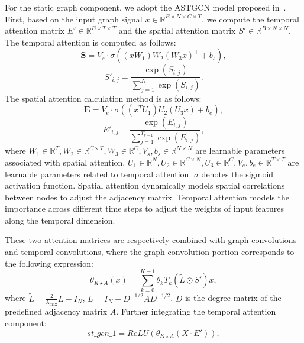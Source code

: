 \documentclass[preprint,12pt,authoryear]{elsarticle}
\begin{document}
For the static graph component, we adopt the ASTGCN model proposed in~\cite{guo2019attention}. First, based on the input graph signal $x\in \mathbb{R}^{B\times N \times C \times T}$, we compute the temporal attention matrix $E'\in \mathbb{R}^{B\times T\times T}$ and the spatial attention matrix $S'\in \mathbb{R}^{B\times N\times N}$. The temporal attention is computed as follows:
\begin{equation}
\mathbf{S} = V_s \cdot \sigma\left( (x W_1) W_2 (W_3 x)^\top + b_s \right),
\end{equation}
\begin{equation}
S'_{i,j} = \frac{\exp(S_{i,j})}{\sum_{j=1}^{N} \exp(S_{i,j})}.
\end{equation}
The spatial attention calculation method is as follows:
\begin{equation}
\mathbf{E} = V_e \cdot \sigma\left( (x^T U_1) U_2 (U_3 x) + b_e \right),
\end{equation}
\begin{equation}
E'_{i,j} = \frac{\exp(E_{i,j})}{\sum_{j=1}^{T_{r-1}} \exp(E_{i,j})},
\end{equation}
where $W_1\in\mathbb{R}^{T},W_2\in\mathbb{R}^{C\times T},W_3\in\mathbb{R}^{C},V_s,b_s\in \mathbb{R}^{N \times N}$ are learnable parameters associated with spatial attention. $U_1\in\mathbb{R}^{N},U_2\in\mathbb{R}^{C\times N},U_3\in\mathbb{R}^{C},V_e,b_e\in \mathbb{R}^{T \times T}$ are learnable parameters related to temporal attention. $\sigma$ denotes the sigmoid activation function. Spatial attention dynamically models spatial correlations between nodes to adjust the adjacency matrix. Temporal attention models the importance across different time steps to adjust the weights of input features along the temporal dimension. 

These two attention matrices are respectively combined with graph convolutions and temporal convolutions, where the graph convolution portion corresponds to the following expression:
\begin{equation}
\theta_{K\star A}(x)= \sum_{k=0}^{K-1} \theta_k T_k(\tilde{L}\odot S')x,
\end{equation}
where $\tilde{L}=\frac{2}{\lambda_{\max}}L-I_N$, $L=I_N-D^{-1/2}AD^{-1/2}$. $D$ is the degree matrix of the predefined adjacency matrix $A$. Further integrating the temporal attention component:
\begin{equation}
st\_gcn\_1 = ReLU(\theta_{K\star A}(X\cdot E')),
\end{equation}
\end{document}
